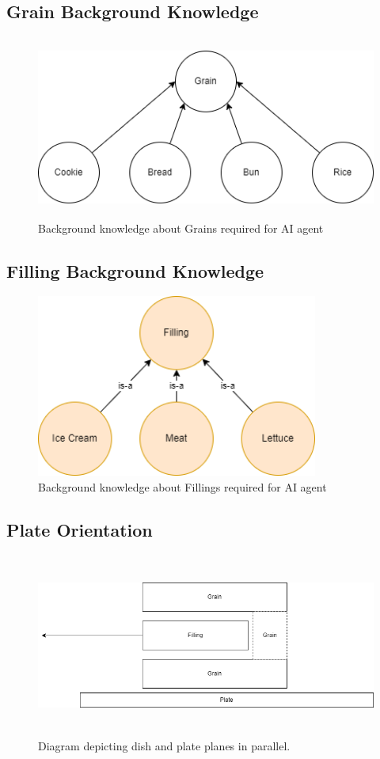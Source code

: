 \subsection{Grain Background Knowledge}
\label{appendix:grain}
\begin{figure}[H]
	\centering
	\includegraphics[height=6cm]{Figures/bg-knowledge.png}
	\caption{Background knowledge about Grains required for AI agent}
	\label{fig:bg}
\end{figure}

\subsection{Filling Background Knowledge}
\label{appendix:filling}
\begin{figure}[H]
	\centering
	\includegraphics[height=6cm]{Figures/bg-filling-knowledge.png}
	\caption{Background knowledge about Fillings required for AI agent}
	\label{fig:bg-filling}
\end{figure}


\subsection{Plate Orientation}
\label{appendix:plate}
\begin{figure}[H]
	\centering
	\includegraphics[height=6cm]{Figures/plane-horizontal.png}
	\caption{Diagram depicting dish and plate planes in parallel.}
	\label{fig:plate}
\end{figure}

